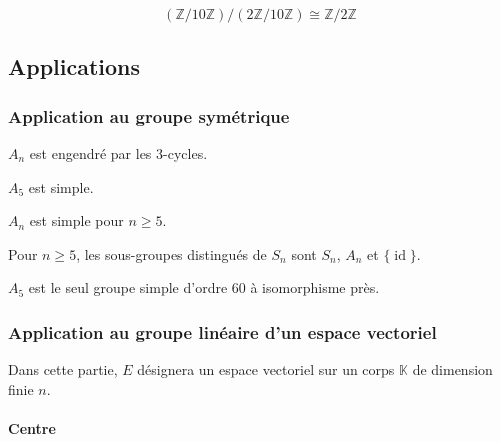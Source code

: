 	\begin{example}
		\[ (\mathbb{Z}/10\mathbb{Z})/(2\mathbb{Z}/10\mathbb{Z}) \cong \mathbb{Z}/2\mathbb{Z} \]
	\end{example}

	\subsection{Applications}

	\subsubsection{Application au groupe symétrique}


	\begin{lemma}
		$A_n$ est engendré par les $3$-cycles.
	\end{lemma}


	\begin{lemma}
		$A_5$ est simple.
	\end{lemma}


	\begin{theorem}
		$A_n$ est simple pour $n \geq 5$.
	\end{theorem}

	\begin{corollary}
		Pour $n \geq 5$, les sous-groupes distingués de $S_n$ sont $S_n$, $A_n$ et $\{\operatorname{id}\}$.
	\end{corollary}


	\begin{application}
		$A_5$ est le seul groupe simple d'ordre $60$ à isomorphisme près.
	\end{application}

	\subsubsection{Application au groupe linéaire d'un espace vectoriel}

	Dans cette partie, $E$ désignera un espace vectoriel sur un corps $\mathbb{K}$ de dimension finie $n$.

	\paragraph{Centre}

